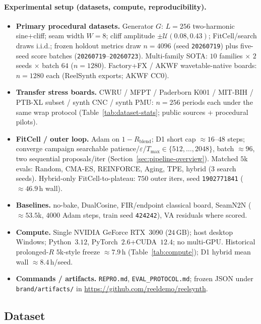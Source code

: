 \paragraph{Experimental setup (datasets, compute, reproducibility).}
\begin{itemize}
  \item \textbf{Primary procedural datasets.} Generator $G$: $L{=}256$ two-harmonic sine{+}cliff; seam width $W{=}8$; cliff amplitude $\pm\mathcal{U}(0.08,0.43)$; FitCell/search draws i.i.d.; frozen holdout metrics draw $n{=}4096$ (seed \texttt{20260719}) plus five-seed score batches (\texttt{20260719}--\texttt{20260723}).
    Multi-family SOTA: $10$ families $\times$ $2$ seeds $\times$ batch $64$ ($n{=}1280$).
    Factory+FX / AKWF wavetable-native boards: $n{=}1280$ each (ReelSynth exports; AKWF CC0).
  \item \textbf{Transfer stress boards.} CWRU / MFPT / Paderborn K001 / MIT-BIH / PTB-XL subset / synth CNC / synth PMU: $n{=}256$ periods each under the same wrap protocol (Table~\ref{tab:dataset-stats}; public sources + procedural pilots).
  \item \textbf{FitCell / outer loop.} Adam on $1-R_{\mathrm{blend}}$; D1 short cap ${\approx}16$--$48$ steps; converge campaign searchable patience/$\varepsilon$/$T_{\max}\!\in\!\{512,\ldots,2048\}$, batch ${\approx}96$, two sequential proposals/iter (Section~\ref{sec:pipeline-overview}).
    Matched $5$k evals: Random, CMA-ES, REINFORCE, Aging, TPE, hybrid (3 search seeds).
    Hybrid-only FitCell-to-plateau: $750$ outer iters, seed \texttt{1902771841} (${\approx}46.9$\,h wall).
  \item \textbf{Baselines.} no-bake, DualCosine, FIR/endpoint classical board, SeamN2N (${\approx}53.5$k, $4000$ Adam steps, train seed \texttt{424242}), VA residuals where scored.
  \item \textbf{Compute.} Single NVIDIA GeForce RTX~3090 ($24$\,GB); host desktop Windows; Python~$3.12$, PyTorch~$2.6$+CUDA~$12.4$; no multi-GPU.
    Historical prolonged-$R$ $5$k-style freeze ${\approx}7.9$\,h (Table~\ref{tab:compute}); D1 hybrid mean wall ${\approx}8.4$\,h/seed.
  \item \textbf{Commands / artifacts.} \texttt{REPRO.md}, \texttt{EVAL\_PROTOCOL.md}; frozen JSON under \texttt{brand/artifacts/} in \url{https://github.com/reeldemo/reelsynth}.
\end{itemize}

\subsection{Dataset}
\label{sec:dataset}

